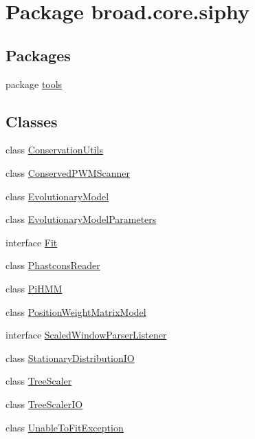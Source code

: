 \hypertarget{namespacebroad_1_1core_1_1siphy}{\section{Package broad.\+core.\+siphy}
\label{namespacebroad_1_1core_1_1siphy}
}
\subsection*{Packages}
\begin{DoxyCompactItemize}
\item 
package \hyperlink{namespacebroad_1_1core_1_1siphy_1_1tools}{tools}
\end{DoxyCompactItemize}
\subsection*{Classes}
\begin{DoxyCompactItemize}
\item 
class \hyperlink{classbroad_1_1core_1_1siphy_1_1_conservation_utils}{Conservation\+Utils}
\item 
class \hyperlink{classbroad_1_1core_1_1siphy_1_1_conserved_p_w_m_scanner}{Conserved\+P\+W\+M\+Scanner}
\item 
class \hyperlink{classbroad_1_1core_1_1siphy_1_1_evolutionary_model}{Evolutionary\+Model}
\item 
class \hyperlink{classbroad_1_1core_1_1siphy_1_1_evolutionary_model_parameters}{Evolutionary\+Model\+Parameters}
\item 
interface \hyperlink{interfacebroad_1_1core_1_1siphy_1_1_fit}{Fit}
\item 
class \hyperlink{classbroad_1_1core_1_1siphy_1_1_phastcons_reader}{Phastcons\+Reader}
\item 
class \hyperlink{classbroad_1_1core_1_1siphy_1_1_pi_h_m_m}{Pi\+H\+M\+M}
\item 
class \hyperlink{classbroad_1_1core_1_1siphy_1_1_position_weight_matrix_model}{Position\+Weight\+Matrix\+Model}
\item 
interface \hyperlink{interfacebroad_1_1core_1_1siphy_1_1_scaled_window_parser_listener}{Scaled\+Window\+Parser\+Listener}
\item 
class \hyperlink{classbroad_1_1core_1_1siphy_1_1_stationary_distribution_i_o}{Stationary\+Distribution\+I\+O}
\item 
class \hyperlink{classbroad_1_1core_1_1siphy_1_1_tree_scaler}{Tree\+Scaler}
\item 
class \hyperlink{classbroad_1_1core_1_1siphy_1_1_tree_scaler_i_o}{Tree\+Scaler\+I\+O}
\item 
class \hyperlink{classbroad_1_1core_1_1siphy_1_1_unable_to_fit_exception}{Unable\+To\+Fit\+Exception}
\end{DoxyCompactItemize}
